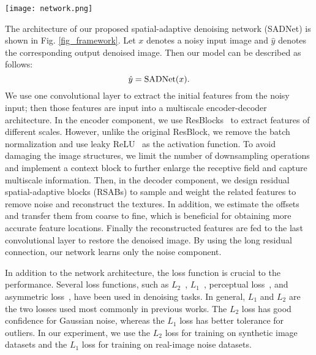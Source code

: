 \documentclass[runningheads]{llncs}
\begin{document}
\begin{figure*}[t]
\begin{center}
\texttt{[image: network.png]}
\end{center}
\setlength{\abovecaptionskip}{0.cm}
  \caption{The framework of our proposed spatial-adaptive denoising network.}
\label{fig_framework}
\end{figure*}

The architecture of our proposed spatial-adaptive denoising network (SADNet) is shown in Fig. \ref{fig_framework}. Let $x$ denotes a noisy input image and $\hat{y}$ denotes the corresponding output denoised image. Then our model can be described as follows:
\begin{equation}
    \hat{y}={\rm SADNet}(x).
\end{equation}
We use one convolutional layer to extract the initial features from the noisy input; then those features are input into a multiscale encoder-decoder architecture. In the encoder component, we use ResBlocks~\cite{he2016deep} to extract features of different scales. However, unlike the original ResBlock, we remove the batch normalization and use leaky ReLU~\cite{maas2013rectifier} as the activation function. To avoid damaging the image structures, we limit the number of downsampling operations and implement a context block to further enlarge the receptive field and capture multiscale information. Then, in the decoder component, we design residual spatial-adaptive blocks (RSABs) to sample and weight the related features to remove noise and reconstruct the textures. In addition, we estimate the offsets and transfer them from coarse to fine, which is beneficial for obtaining more accurate feature locations. Finally the reconstructed features are fed to the last convolutional layer to restore the denoised image. By using the long residual connection, our network learns only the noise component.

In addition to the network architecture, the loss function is crucial to the performance. Several loss functions, such as $L_2$~\cite{zhang2017beyond,zhang2018ffdnet,zhang2019residual}, $L_1$~\cite{anwar2019real}, perceptual loss~\cite{Jiao2017FormResNet}, and asymmetric loss~\cite{guo2019toward}, have been used in denoising tasks. In general, $L_1$ and $L_2$ are the two losses used most commonly in previous works. The $L_2$ loss has good confidence for Gaussian noise, whereas the $L_1$ loss has better tolerance for outliers. 
In our experiment, we use the $L_2$ loss for training on synthetic image datasets and the $L_1$ loss for training on real-image noise datasets.
\end{document}
